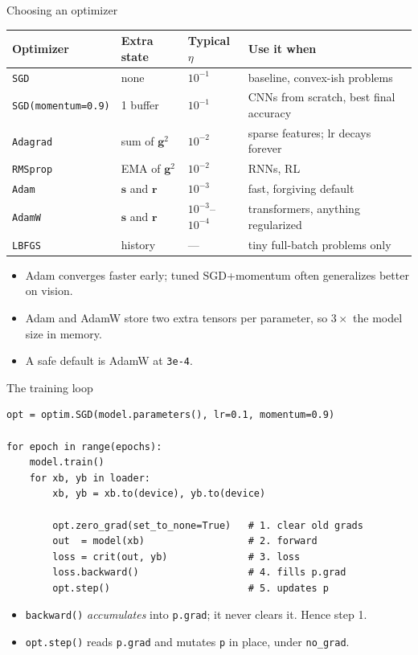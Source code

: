 \documentclass[10pt,aspectratio=169]{beamer}
\begin{document}
\begin{frame}{Choosing an optimizer}
\begin{center}
\footnotesize
\begin{tabular}{@{}llll@{}}
\toprule
\textbf{Optimizer} & \textbf{Extra state} & \textbf{Typical $\eta$} & \textbf{Use it when}\\
\midrule
\texttt{SGD} & none & $10^{-1}$ & baseline, convex-ish problems\\
\texttt{SGD(momentum=0.9)} & 1 buffer & $10^{-1}$ & CNNs from scratch, best final accuracy\\
\texttt{Adagrad} & sum of $\mathbf{g}^2$ & $10^{-2}$ & sparse features; lr decays forever\\
\texttt{RMSprop} & EMA of $\mathbf{g}^2$ & $10^{-2}$ & RNNs, RL\\
\texttt{Adam} & $\mathbf{s}$ and $\mathbf{r}$ & $10^{-3}$ & fast, forgiving default\\
\texttt{AdamW} & $\mathbf{s}$ and $\mathbf{r}$ & $10^{-3}$--$10^{-4}$ & transformers, anything regularized\\
\texttt{LBFGS} & history & --- & tiny full-batch problems only\\
\bottomrule
\end{tabular}
\end{center}
\vspace{0.35cm}
\begin{itemize}
    \item Adam converges faster early; tuned SGD+momentum often generalizes better on vision.
    \item Adam and AdamW store two extra tensors per parameter, so $3\times$ the model size in memory.
    \item A safe default is AdamW at \texttt{3e-4}.
\end{itemize}
\end{frame}

\begin{frame}[fragile]{The training loop}
\begin{lstlisting}
opt = optim.SGD(model.parameters(), lr=0.1, momentum=0.9)

for epoch in range(epochs):
    model.train()
    for xb, yb in loader:
        xb, yb = xb.to(device), yb.to(device)

        opt.zero_grad(set_to_none=True)   # 1. clear old grads
        out  = model(xb)                  # 2. forward
        loss = crit(out, yb)              # 3. loss
        loss.backward()                   # 4. fills p.grad
        opt.step()                        # 5. updates p
\end{lstlisting}
\begin{itemize}
    \item \texttt{backward()} \emph{accumulates} into \texttt{p.grad}; it never clears it. Hence step 1.
    \item \texttt{opt.step()} reads \texttt{p.grad} and mutates \texttt{p} in place, under \texttt{no\_grad}.
\end{itemize}
\end{frame}
\end{document}

